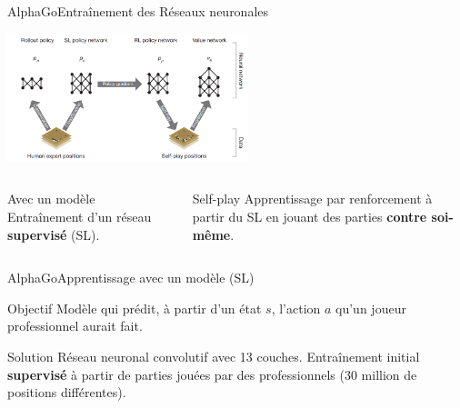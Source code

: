 \begin{frame}{AlphaGo}{Entraînement des Réseaux neuronales}
    \begin{center}
        \includegraphics[width=7cm]{ressources/AlphaGo/Entrainement}
        \begin{columns}[t]
            \begin{column}{.4\textwidth}
                \begin{block}{Avec un modèle}
                    Entraînement d'un réseau \textbf{supervisé} (SL).
                \end{block}
            \end{column}
            \begin{column}{.4\textwidth}
                \begin{block}{Self-play}
                    Apprentissage par renforcement à partir du SL en jouant des parties \textbf{contre soi-même}.
                \end{block}
            \end{column}
        \end{columns}

    \end{center}
\end{frame}


\begin{frame}{AlphaGo}{Apprentissage avec un modèle (SL)}
    \begin{center}

        \begin{block}{Objectif}
            Modèle qui prédit, à partir d'un état $s$, l'action $a$ qu'un joueur professionnel aurait fait.
        \end{block}
        \vspace{1cm}
        \begin{block}{Solution}
            Réseau neuronal convolutif avec 13 couches.
            Entraînement initial \textbf{supervisé} à partir de parties jouées par des professionnels (30 million de positions différentes).
        \end{block}
    \end{center}
\end{frame}

